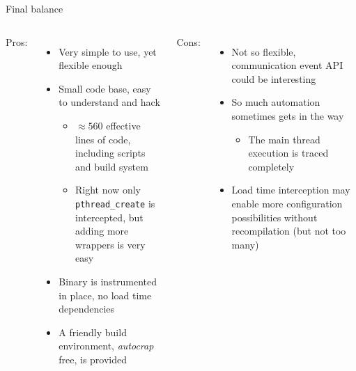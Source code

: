 \documentclass{beamer}
\begin{document}
\begin{frame}{Final balance}
  \begin{columns}[t]
    Pros:
    \begin{itemize}
      \item Very simple to use, yet flexible enough
      \item Small code base, easy to understand and hack
      \begin{itemize}
        \item $\approx 560$ effective lines of code, including scripts and build
        system
        \item Right now only \texttt{pthread\_create} is intercepted, but adding
        more wrappers is very easy
      \end{itemize}
      \item Binary is instrumented in place, no load time dependencies
      \item A friendly build environment, \emph{autocrap} free, is provided
    \end{itemize}
    Cons:
    \begin{itemize}
      \item Not so flexible, communication event API could be interesting
      \item So much automation sometimes gets in the way
      \begin{itemize}
        \item The main thread execution is traced completely
      \end{itemize}
      \item Load time interception may enable more configuration possibilities
      without recompilation (but not too many)
    \end{itemize}
  \end{columns}
\end{frame}
\end{document}
